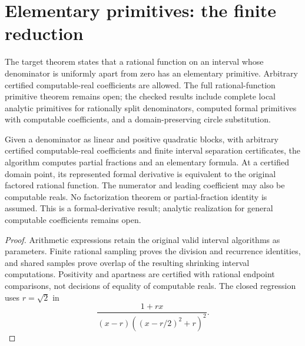 \section{Elementary primitives: the finite reduction}
\label{sec:rational-primitives}

The target theorem states that a rational function on an interval whose
denominator is uniformly apart from zero has an elementary primitive.
Arbitrary certified computable-real coefficients are allowed. The full rational-function primitive theorem remains open;
the checked results include complete local analytic primitives for rationally
split denominators, computed formal primitives with computable coefficients,
and a domain-preserving circle substitution.



\begin{theorem}
\label{thm:computable-factored-primitives}
\leanok
Given a denominator as linear and positive quadratic blocks, with arbitrary
certified computable-real coefficients and finite interval separation
certificates, the algorithm computes partial fractions and an elementary
formula. At a certified domain point, its represented formal derivative is
equivalent to the original factored rational function. The numerator and
leading coefficient may also be computable reals. No factorization theorem
or partial-fraction identity is assumed. This is a formal-derivative result;
analytic realization for general computable coefficients remains open.
\end{theorem}

\begin{proof}
Arithmetic expressions retain the original valid interval algorithms as
parameters. Finite rational sampling proves the division and recurrence
identities, and shared samples prove overlap of the resulting shrinking
interval computations. Positivity and apartness are certified with rational
endpoint comparisons, not decisions of equality of computable reals. The
closed regression uses $r=\sqrt{2}$ in
\[
  \frac{1+rx}{(x-r)((x-r/2)^2+r)^2}.
\]
\end{proof}

